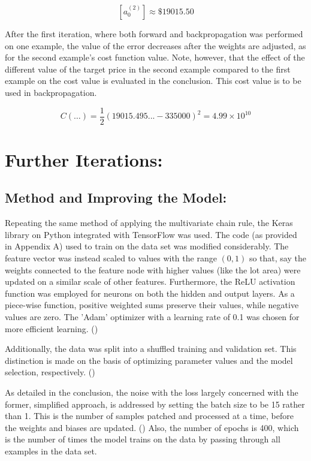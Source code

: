 \documentclass[12pt,a4paper]{article}
\begin{document}
\begin{equation}
\left[a_0^{\left(2\right)}\right] \approx \$19015.50
\end{equation}

After the first iteration, where both forward and backpropagation was performed on one example, the value of the error decreases after the weights are adjusted, as for the second example’s cost function value. Note, however, that the effect of the different value of the target price in the second example compared to the first example on the cost value is evaluated in the conclusion. This cost value is to be used in backpropagation.

\begin{equation}
C\left(\ldots\right)= \frac{1}{2}\left(19015.495... - 335000\right)^2 =  4.99 \times{10}^{10}
\end{equation}


\section{Further Iterations:}

\subsection{Method and Improving the Model:}

Repeating the same method of applying the multivariate chain rule, the Keras library on Python integrated with TensorFlow was used. The code (as provided in Appendix A) used to train on the data set was modified considerably. The feature vector was instead scaled to values with the range $(0,1)$ so that, say the weights connected to the feature node with higher values (like the lot area) were updated on a similar scale of other features. Furthermore, the ReLU activation function was employed for neurons on both the hidden and output layers. As a piece-wise function, positive weighted sums preserve their values, while negative values are zero. The 'Adam' optimizer with a learning rate of 0.1 was chosen for more efficient learning. ()

Additionally, the data was split into a shuffled training and validation set. This distinction is made on the basis of optimizing parameter values and the model selection, respectively. ()

As detailed in the conclusion, the noise with the loss largely concerned with the former, simplified approach, is addressed by setting the batch size to be 15 rather than 1. This is the number of samples patched and processed at a time, before the weights and biases are updated. () Also, the number of epochs is 400, which is the number of times the model trains on the data by passing through all examples in the data set. 
\end{document}
